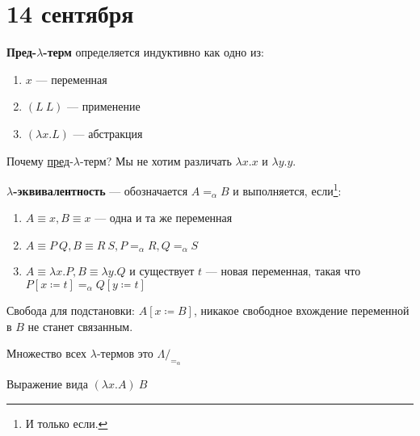 \chapter{14 сентября}

\begin{definition}
    \textbf{Пред-\(\lambda\)-терм} определяется индуктивно как одно из:
    \begin{enumerate}
        \item \(x\) --- переменная
        \item \((L\ L)\) --- применение
        \item \((\lambda x.L)\) --- абстракция
    \end{enumerate}
\end{definition}

Почему \underline{пред}-\(\lambda\)-терм? Мы не хотим различать \(\lambda x.x\) и \(\lambda y.y\).

\begin{definition}
    \textbf{\(\lambda\)-эквивалентность} --- обозначается \(A =_\alpha B\) и выполняется, если\footnote{И только если.}:
    \begin{enumerate}
        \item \(A \equiv x, B \equiv x\) --- одна и та же переменная
        \item \(A \equiv P\ Q, B \equiv R\ S, P =_\alpha R, Q =_\alpha S\)
        \item \(A \equiv \lambda x.P, B \equiv \lambda y.Q\) и существует \(t\) --- новая переменная, такая что \(P[x \coloneqq t] =_\alpha Q[y \coloneqq t]\)
    \end{enumerate}
\end{definition}

\begin{definition}
    Свобода для подстановки: \(A[x \coloneqq B]\), никакое свободное вхождение переменной в \(B\) не станет связанным.
\end{definition}

\begin{definition}
    Множество всех \(\lambda\)-термов это \(\Lambda /_{ =_\alpha}\)
\end{definition}

\begin{definition}
    Выражение вида \((\lambda x.A)\ B\)
\end{definition}

